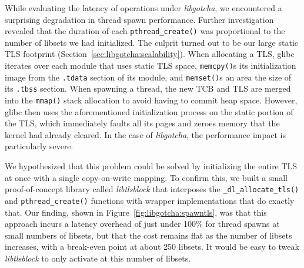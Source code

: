 While evaluating the latency of operations under \textit{libgotcha}, we encountered a
surprising degradation in thread spawn performance.  Further investigation revealed
that the duration of each \texttt{pthread\_create()} was proportional to the number
of libsets we had initialized.  The culprit turned out to be our large static TLS
footprint (Section~\ref{sec:libgotcha:scalability}).  When allocating a TLS, glibc
iterates over each module that uses static TLS space, \texttt{memcpy()}s its
initialization image from the \texttt{.tdata} section of its module, and
\texttt{memset()}s an area the size of its \texttt{.tbss} section.  When
spawning a thread, the new TCB and TLS are merged into the \texttt{mmap()} stack
allocation to avoid having to commit heap space.  However, glibc then uses the
aforementioned initialization process on the static portion of the TLS, which
immediately faults all its pages and zeroes memory that the kernel had already
cleared.  In the case of \textit{libgotcha}, the performance impact is particularly
severe.

We hypothesized that this problem could be solved by initializing the entire TLS at
once with a single copy-on-write mapping.  To confirm this, we built a small
proof-of-concept library called \textit{libtlsblock} that interposes the
\texttt{\_dl\_allocate\_tls()} and \texttt{pthread\_create()} functions with
wrapper implementations that do exactly that.  Our finding, shown in
Figure~\ref{fig:libgotcha:spawntls}, was that this approach incurs a latency overhead
of just under 100\% for thread spawns at small numbers of
libsets, but that the cost remains flat as the number of libsets
increases, with a break-even point at about 250 libsets.  It would be easy to
tweak \textit{libtlsblock} to only activate at this number of libsets.
